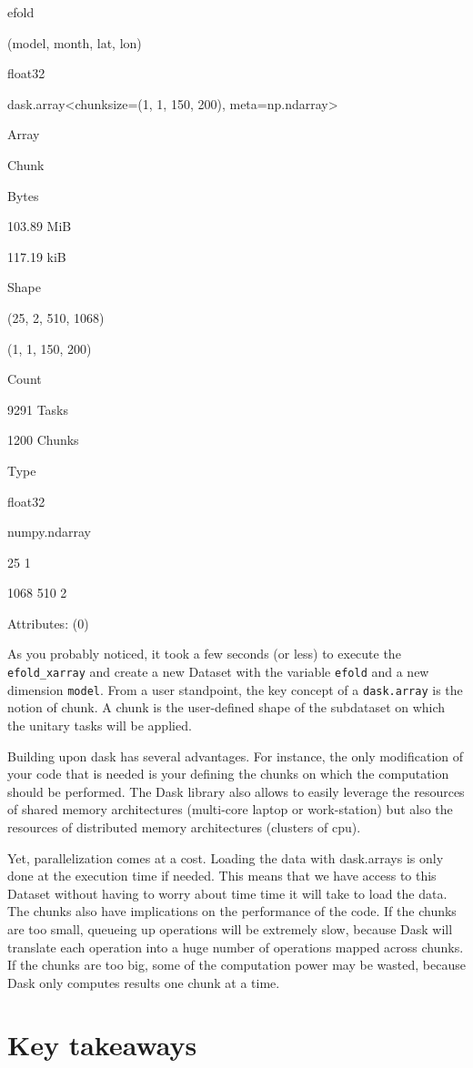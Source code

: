 \documentclass[
]{book}
\begin{document}
{efold}

(model, month, lat, lon)

float32

dask.array\textless chunksize=(1, 1, 150, 200), meta=np.ndarray\textgreater{}

Array

Chunk

Bytes

103.89 MiB

117.19 kiB

Shape

(25, 2, 510, 1068)

(1, 1, 150, 200)

Count

9291 Tasks

1200 Chunks

Type

float32

numpy.ndarray

25
1

1068
510
2

Attributes: {(0)}

As you probably noticed, it took a few seconds (or less) to execute the \texttt{efold\_xarray} and create a new Dataset with the variable \texttt{efold} and a new dimension \texttt{model}. From a user standpoint, the key concept of a \texttt{dask.array} is the notion of chunk. A chunk is the user-defined shape of the subdataset on which the unitary tasks will be applied.

Building upon dask has several advantages. For instance, the only modification of your code that is needed is your defining the chunks on which the computation should be performed. The Dask library also allows to easily leverage the resources of shared memory architectures (multi-core laptop or work-station) but also the resources of distributed memory architectures (clusters of cpu).

Yet, parallelization comes at a cost. Loading the data with dask.arrays is only done at the execution time if needed. This means that we have access to this Dataset without having to worry about time time it will take to load the data. The chunks also have implications on the performance of the code. If the chunks are too small, queueing up operations will be extremely slow, because Dask will translate each operation into a huge number of operations mapped across chunks. If the chunks are too big, some of the computation power may be wasted, because Dask only computes results one chunk at a time.

\hypertarget{key-takeaways}{%
\chapter{Key takeaways}\label{key-takeaways}}

  
\end{document}
